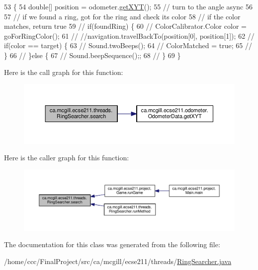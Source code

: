 \begin{DoxyCode}
53                         \{
54     \textcolor{keywordtype}{double}[] position = odometer.\hyperlink{classca_1_1mcgill_1_1ecse211_1_1odometer_1_1_odometer_data_a8f40f0264c68f0cbed4fff1723ae7863}{getXYT}();
55     \textcolor{comment}{// turn to the angle async}
56 
57     \textcolor{comment}{// if we found a ring, got for the ring and check its color}
58     \textcolor{comment}{// if the color matches, return true}
59     \textcolor{comment}{// if(foundRing) \{}
60     \textcolor{comment}{// ColorCalibrator.Color color = goForRingColor();}
61     \textcolor{comment}{// //navigation.travelBackTo(position[0], position[1]);}
62     \textcolor{comment}{// if(color == target) \{}
63     \textcolor{comment}{// Sound.twoBeeps();}
64     \textcolor{comment}{// ColorMatched = true;}
65     \textcolor{comment}{// \}}
66     \textcolor{comment}{// \}else \{}
67     \textcolor{comment}{// Sound.beepSequence();;}
68     \textcolor{comment}{// \}}
69   \}
\end{DoxyCode}
Here is the call graph for this function\+:
\nopagebreak
\begin{figure}[H]
\begin{center}
\leavevmode
\includegraphics[width=350pt]{classca_1_1mcgill_1_1ecse211_1_1threads_1_1_ring_searcher_abd2b2c172ea393ce4185027c8a12780f_cgraph}
\end{center}
\end{figure}
Here is the caller graph for this function\+:
\nopagebreak
\begin{figure}[H]
\begin{center}
\leavevmode
\includegraphics[width=350pt]{classca_1_1mcgill_1_1ecse211_1_1threads_1_1_ring_searcher_abd2b2c172ea393ce4185027c8a12780f_icgraph}
\end{center}
\end{figure}


The documentation for this class was generated from the following file\+:\begin{DoxyCompactItemize}
\item 
/home/ccc/\+Final\+Project/src/ca/mcgill/ecse211/threads/\hyperlink{_ring_searcher_8java}{Ring\+Searcher.\+java}\end{DoxyCompactItemize}
